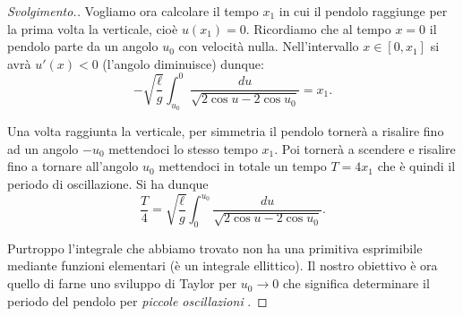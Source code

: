 \begin{proof}[Svolgimento.]
Vogliamo ora calcolare il tempo $x_1$ in cui il pendolo raggiunge per la prima
volta la verticale, cioè $u(x_1)=0$.
Ricordiamo che al tempo $x=0$ il pendolo parte da un angolo $u_0$
con velocità nulla. Nell'intervallo $x\in[0,x_1]$ si avrà $u'(x)<0$
(l'angolo diminuisce) dunque:
\[
-\sqrt{\frac{\ell}{g}}\int_{u_0}^{0} \frac{du}{\sqrt{2\cos u - 2\cos u_0}}
= x_1.
\]

Una volta raggiunta la verticale, per simmetria il pendolo tornerà a risalire
fino ad un angolo $-u_0$ mettendoci lo stesso tempo $x_1$. Poi tornerà a scendere
e risalire fino a tornare all'angolo $u_0$ mettendoci in totale un tempo
$T=4x_1$ che è quindi il periodo di oscillazione. Si ha dunque
\[
  \frac{T}{4} = \sqrt{\frac \ell g}\int_0^{u_0} \frac{du}{\sqrt{2\cos u - 2\cos u_0}}.
\]

Purtroppo l'integrale che abbiamo trovato non ha una primitiva
esprimibile mediante funzioni elementari (è un integrale ellittico).
Il nostro obiettivo è ora quello di farne uno sviluppo di Taylor
per $u_0\to 0$ che significa determinare
il periodo del pendolo per \emph{piccole oscillazioni}%
.


\end{proof}
